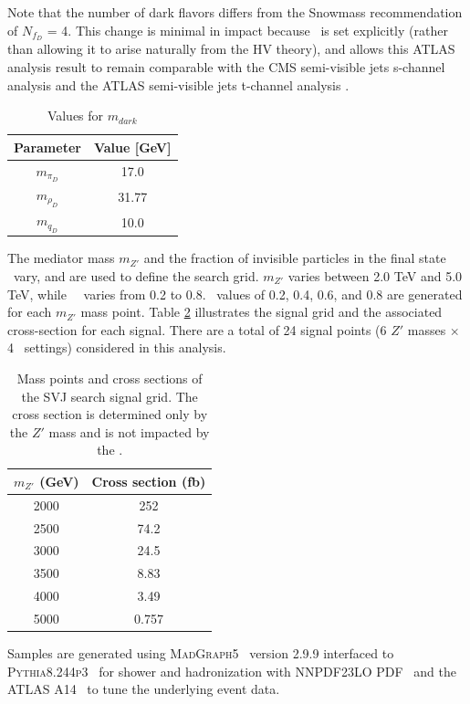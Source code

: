 Note that the number of dark flavors differs from the Snowmass recommendation of $N_{f_D}$ = 4. 
This change is minimal in impact because \rinv~is set explicitly (rather than allowing it to arise naturally from the HV theory), and allows this ATLAS analysis result to remain comparable with the CMS semi-visible jets s-channel analysis \cite{cms_svj} and the ATLAS semi-visible jets t-channel analysis \cite{tchannel}. \par

\begin{table}
\centering
  \begin{tabular}{ |c|c| }
    \hline
    Parameter & Value [GeV] \\
    \hline
     $m_{\pi_D}$ & 17.0 \\
     $m_{\rho_D}$ & 31.77 \\ 
     $m_{q_D}$ & 10.0 \\ 
    \hline
  \end{tabular}
  \caption{Values for $m_{dark}$}
  \label{tab:model_mdark}
\end{table}

The mediator mass $m_{Z'}$ and the fraction of invisible particles in the final state \rinv~vary, and are used to define the search grid. $m_{Z'}$ varies between 2.0 TeV and 5.0 TeV, while~\rinv~ varies from 0.2 to 0.8. \rinv~values of 0.2, 0.4, 0.6, and 0.8 are generated for each $m_{Z'}$ mass point. Table \ref{tab:sig_grid} illustrates the signal grid and the associated cross-section for each signal. There are a total of 24 signal points (6 $Z'$ masses $\times$ 4 \rinv~settings) considered in this analysis.

\begin{table}
\centering
  \begin{tabular}{ |c|c| }
    \hline
    $m_{Z'}$ (GeV) & Cross section (fb)  \\
    \hline
     2000 &  252 \\
     2500 &  74.2 \\
     3000 &  24.5\\ 
     3500 &  8.83\\
     4000 &  3.49 \\ 
     5000 &  0.757 \\
    \hline
  \end{tabular}
  \caption{Mass points and cross sections of the SVJ search signal grid. The cross section is determined only by the $Z'$ mass and is not impacted by the \rinv. }
  \label{tab:sig_grid}
\end{table}

Samples are generated using 
\textsc{MadGraph5}~\cite{Alwall:2014hca} version 2.9.9 interfaced to 
\textsc{Pythia8.244p3}~\cite{pythia} for shower and hadronization with 
NNPDF23LO PDF~\cite{Butterworth:2015oua} and the 
ATLAS A14~\cite{Skands:2014pea} to tune the underlying event data.
